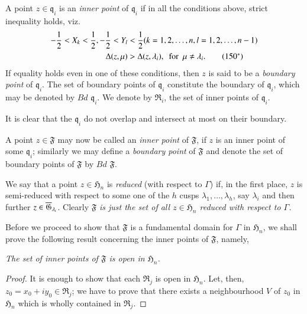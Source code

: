 A point $z\in\mathfrak{q}_{i}$ is an {\em inner point} of
$\mathfrak{q}_{i}$ if in all the conditions above, strict inequality
holds, viz.
\begin{align*}
-\frac{1}{2}<X_{k}<\frac{1}{2},-\frac{1}{2}<Y_{l} &<
\frac{1}{2}(k=1,2,\ldots,n,l=1,2,\ldots,n-1)\\
\Delta(z,\mu) &> \Delta(z,\lambda_{i}),\text{ \ for \ } \mu\neq
\lambda_{i}.\tag{$150^{\ast}$}\label{150*} 
\end{align*}
If equality holds even in one of these conditions, then $z$ is said to
be a {\em boundary point} of $\mathfrak{q}_{i}$. The set of boundary
points of $\mathfrak{q}_{i}$ constitute the boundary of
$\mathfrak{q}_{i}$, which may be denoted by $Bd$
$\mathfrak{q}_{i}$. We denote by $\mathfrak{R}_{i}$, the set of inner
points of $\mathfrak{q}_{i}$.

It is clear that the $\mathfrak{q}_{i}$ do not overlap and intersect
at most on their boundary.

A point $z\in\mathfrak{F}$ may now be called an {\em inner point} of
$\mathfrak{F}$, if $z$ is an inner point of some $\mathfrak{q}_{i}$;
similarly we may define a {\em boundary point} of $\mathfrak{F}$ and
denote the set of boundary points of $\mathfrak{F}$ by $Bd$
$\mathfrak{F}$.

We say that a point $z\in\mathfrak{H}_{n}$ is {\em reduced} (with
respect to $\Gamma$) if, in the first place, $z$ is semi-reduced with
respect to some one of the $h$ cusps $\lambda_{1},\ldots,\lambda_{h}$,
say $\lambda_{i}$ and then further
$z\in\overline{\mathfrak{G}}_{\lambda_{i}}$. Clearly $\mathfrak{F}$ {\em is just
the set of all $z\in\mathfrak{H}_{n}$ reduced with respect to
$\Gamma$.}

Before we proceed to show that $\mathfrak{F}$ is a fundamental domain
for $\Gamma$ in $\mathfrak{H}_{n}$, we shall prove the following
result concerning the inner points of $\mathfrak{F}$, namely,

{\em The set of inner points of $\mathfrak{F}$ is open in
  $\mathfrak{H}_{n}$.}

\begin{proof}
It is enough to show that each $\mathfrak{R}_{j}$ is open in
$\mathfrak{H}_{n}$. Let, then, $z_{0}=x_{0}+iy_{0}\in
\mathfrak{R}_{j}$; we have to prove that there exists a neighbourhood
$V$ of $z_{0}$ in $\mathfrak{H}_{n}$ which is wholly contained in
$\mathfrak{R}_{j}$. 
\end{proof}

